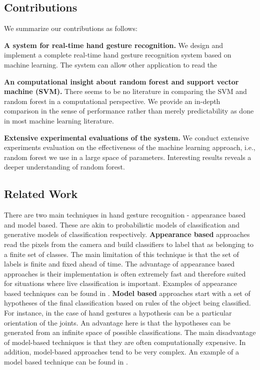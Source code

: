 \subsection{Contributions}

We summarize our contributions as follows:

\textbf{A system for real-time hand gesture recognition.} We design and implement a complete real-time hand gesture recognition system based on machine learning. The system can allow other application to read the 

\textbf{An computational insight about random forest and support vector machine (SVM).} There seems to be no literature in comparing the SVM and random forest in a computational perspective. We provide an in-depth comparison in the sense of performance rather than merely predictability as done in most machine learning literature. 

\textbf{Extensive experimental evaluations of the system.} We conduct extensive experiments evaluation on the effectiveness of the machine learning approach, i.e., random forest we use in a large space of parameters. Interesting results reveals a deeper understanding of random forest. 

\subsection{Related Work}

There are two main techniques in hand gesture recognition - appearance based and model based. These are akin to probabilistic models of classification and generative models of classification respectively. \textbf{Appearance based} approaches read the pixels from the camera and build classifiers to label that as belonging to a finite set of classes. The main limitation of this technique is that the set of labels is finite and fixed ahead of time. The advantage of appearance based approaches is their implementation is often extremely fast and therefore suited for situations where live classification is important. Examples of appearance based techniques can be found in \cite{shotton2011, wang2009}. \textbf{Model based} approaches start with a set of hypotheses of the final classification based on rules of the object being classified. For instance, in the case of hand gestures a hypothesis can be a particular orientation of the joints.  An advantage here is that the hypotheses can be generated from an infinite space of possible classifications. The main disadvantage of model-based techniques is that they are often computationally expensive. In addition, model-based approaches tend to be very complex. An example of a model based technique can be found in \cite{oikonomidis2011}.